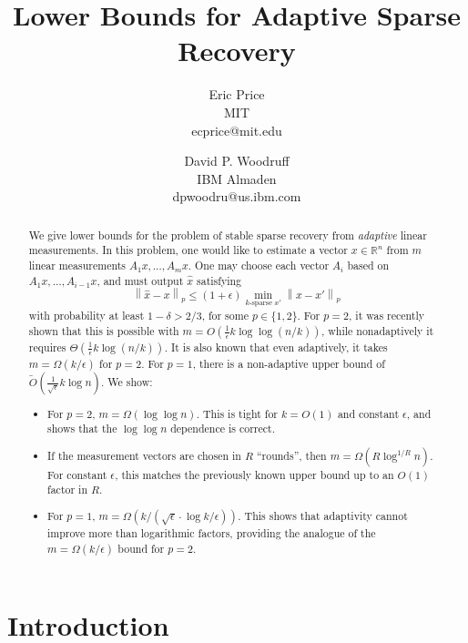 \documentclass[twoside,leqno,twocolumn]{article}
\newcommand{\norm}[2]{\left \lVert#2\right \rVert_{#1}}
\def\R{\mathbb{R}}
\def\eps{\epsilon}
\begin{document}
\title{Lower Bounds for Adaptive Sparse Recovery}

\author{Eric Price\\MIT\\ecprice@mit.edu \and David P. Woodruff\\IBM Almaden\\dpwoodru@us.ibm.com}
\date{}
\maketitle
\thispagestyle{empty}
\setcounter{page}{0}

\begin{abstract}
  We give lower bounds for the problem of stable sparse recovery from
  \emph{adaptive} linear measurements.  In this problem, one would
  like to estimate a vector $x \in \R^n$ from $m$ linear measurements
  $A_1x, \dotsc, A_mx$.  One may choose each vector $A_i$ based on
  $A_1x, \dotsc, A_{i-1}x$, and must output $\hat{x}$ satisfying
  \[
  \norm{p}{\hat{x} - x} \leq (1 + \eps) \min_{k\text{-sparse } x'} \norm{p}{x - x'}
  \]
  with probability at least $1-\delta>2/3$, for some $p \in \{1,2\}$.  For
  $p=2$, it was recently shown that this is possible with $m =
  O(\frac{1}{\eps}k \log \log (n/k))$, while nonadaptively it requires
  $\Theta(\frac{1}{\eps}k \log (n/k))$.  It is also known that even
  adaptively, it takes $m = \Omega(k/\eps)$ for $p = 2$. For $p = 1$,
  there is a non-adaptive upper bound of
  $\widetilde{O}(\frac{1}{\sqrt{\eps}} k\log n)$.  We show:
  \begin{itemize}
  \item For $p=2$, $m = \Omega(\log \log n)$. This is tight for $k =
    O(1)$ and constant $\eps$, and shows that the $\log \log n$
    dependence is correct.
  \item If the measurement vectors are chosen in $R$ ``rounds'', then
    $m = \Omega(R \log^{1/R} n)$.  For constant $\eps$, this matches
    the previously known upper bound up to an $O(1)$ factor in $R$.
  \item For $p=1$, $m = \Omega(k/(\sqrt{\eps} \cdot \log k/\eps))$. This shows that adaptivity
    cannot improve more than logarithmic factors, providing the analogue of the 
    $m = \Omega(k/\eps)$ bound for $p = 2$. 
  \end{itemize}
\end{abstract} 
\newpage

\section{Introduction}
\end{document}
